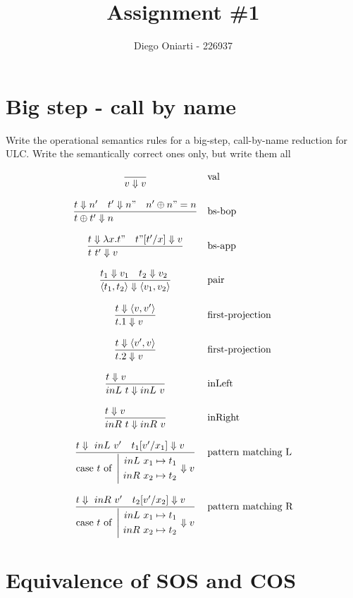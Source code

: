 \documentclass{article}
\title{Assignment \#1}
\author{Diego Oniarti - 226937}
\date{}
\newcommand{\bop}[0]{\ensuremath\oplus}
\newcommand{\st}[3][]{\ensuremath{\displaystyle\frac{#3\hfill}{#2\hfill} \text{#1}}}
\newcommand{\lam}[2]{\ensuremath{\lambda#1.#2}}
\newcommand{\inl}[0]{\ensuremath{\ inL\ }}
\newcommand{\inr}[0]{\ensuremath{\ inR\ }}
\newcommand{\case}[3]{\ensuremath{\text{case}\ #1\ \text{of}\ \left|\begin{aligned}#2\\#3\end{aligned}\right.}}
\newcommand{\Da}[0]{\ensuremath{\Downarrow}}
\begin{document}
\maketitle

\section{Big step - call by name}
Write the operational semantics rules for a big-step, call-by-name reduction for ULC. Write the semantically correct ones only, but write them all

\[\begin{array}{cl}
    \st{v\Downarrow v}{} & \text{val}\\
    \\
    \st{t \bop t' \Downarrow n}{t\Downarrow n' \quad t'\Downarrow n" \quad n'\bop n" = n} & \text{bs-bop} \\
    \\
    \st{t\ t'\Downarrow v}{t\Downarrow \lam{x}{t"} \quad t"[t'/x]\Downarrow v}  & \text{bs-app} \\
    \\
    \st{\langle t_1, t_2 \rangle \Downarrow \langle v_1,v_2 \rangle}{t_1\Downarrow v_1\quad t_2\Downarrow v_2} & \text{pair} \\
    \\
    \st{t.1\Downarrow v}{t\Downarrow \langle v,v' \rangle} & \text{first-projection} \\
    \\
    \st{t.2\Downarrow v}{t\Downarrow \langle v',v \rangle} & \text{first-projection} \\
    \\
    \st{inL\ t\Downarrow inL\ v}{t\Downarrow v} & \text{inLeft} \\
    \\
    \st{inR\ t\Downarrow inR\ v}{t\Downarrow v} & \text{inRight} \\
    \\
    \st{\case{t}{\inl x_1\mapsto t_1}{\inr x_2\mapsto t_2}\Downarrow v}{t\Da \inl v' \quad t_1[v'/x_1]\Da v} & \text{pattern matching L}
    \\ \\
    \st{\case{t}{\inl x_1\mapsto t_1}{\inr x_2\mapsto t_2}\Downarrow v}{t\Da \inr v' \quad t_2[v'/x_2]\Da v} & \text{pattern matching R}
\end{array}\] 

\section{Equivalence of SOS and COS}
\end{document}
